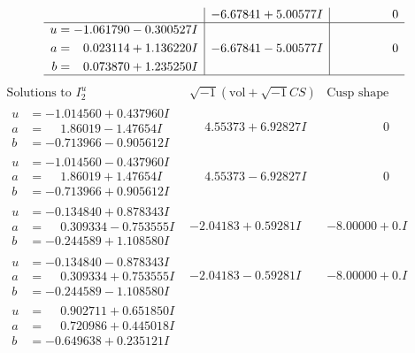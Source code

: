 \documentclass[1p]{elsarticle_modified}
\theoremstyle{definition}
\newcommand{\I}{\sqrt{-1}}
\begin{document}
$$\begin{array}{c|c|c}
 & -6.67841 + 5.00577 I & \phantom{-0.000000 } 0 \\ \hline\begin{aligned}
u &= -1.061790 - 0.300527 I \\
a &= \phantom{-}0.023114 + 1.136220 I \\
b &= \phantom{-}0.073870 + 1.235250 I\end{aligned}
 & -6.67841 - 5.00577 I & \phantom{-0.000000 } 0\\
 \hline 
 \end{array}$$\newpage$$\begin{array}{c|c|c}  
\text{Solutions to }I^u_{2}& \I (\text{vol} + \sqrt{-1}CS) & \text{Cusp shape}\\
 \hline 
\begin{aligned}
u &= -1.014560 + 0.437960 I \\
a &= \phantom{-}1.86019 - 1.47654 I \\
b &= -0.713966 - 0.905612 I\end{aligned}
 & \phantom{-}4.55373 + 6.92827 I & \phantom{-0.000000 } 0 \\ \hline\begin{aligned}
u &= -1.014560 - 0.437960 I \\
a &= \phantom{-}1.86019 + 1.47654 I \\
b &= -0.713966 + 0.905612 I\end{aligned}
 & \phantom{-}4.55373 - 6.92827 I & \phantom{-0.000000 } 0 \\ \hline\begin{aligned}
u &= -0.134840 + 0.878343 I \\
a &= \phantom{-}0.309334 - 0.753555 I \\
b &= -0.244589 + 1.108580 I\end{aligned}
 & -2.04183 + 0.59281 I & -8.00000 + 0. I\phantom{ +0.000000I} \\ \hline\begin{aligned}
u &= -0.134840 - 0.878343 I \\
a &= \phantom{-}0.309334 + 0.753555 I \\
b &= -0.244589 - 1.108580 I\end{aligned}
 & -2.04183 - 0.59281 I & -8.00000 + 0. I\phantom{ +0.000000I} \\ \hline\begin{aligned}
u &= \phantom{-}0.902711 + 0.651850 I \\
a &= \phantom{-}0.720986 + 0.445018 I \\
b &= -0.649638 + 0.235121 I\end{aligned}

\end{array}$$
\end{document}
